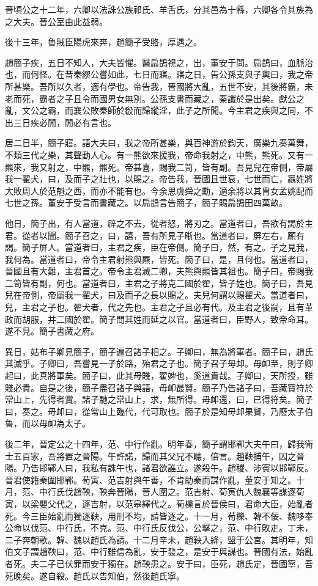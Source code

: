 晉頃公之十二年，六卿以法誅公族祁氏、羊舌氏，分其邑為十縣，六卿各令其族為之大夫。晉公室由此益弱。

後十三年，魯賊臣陽虎來奔，趙簡子受賂，厚遇之。

趙簡子疾，五日不知人，大夫皆懼。醫扁鵲視之，出，董安于問。扁鵲曰，血脈治也，而何怪。在昔秦繆公嘗如此，七日而寤。寤之日，告公孫支與子輿曰，我之帝所甚樂。吾所以久者，適有學也。帝告我，晉國將大亂，五世不安，其後將霸，未老而死，霸者之子且令而國男女無別。公孫支書而藏之，秦讖於是出矣。獻公之亂，文公之霸，而襄公敗秦師於殽而歸縱淫，此子之所聞。今主君之疾與之同，不出三日疾必閒，閒必有言也。

居二日半，簡子寤。語大夫曰，我之帝所甚樂，與百神游於鈞天，廣樂九奏萬舞，不類三代之樂，其聲動人心。有一熊欲來援我，帝命我射之，中熊，熊死。又有一羆來，我又射之，中羆，羆死。帝甚喜，賜我二笥，皆有副。吾見兒在帝側，帝屬我一翟犬，曰，及而子之壯也，以賜之。帝告我，晉國且世衰，七世而亡，嬴姓將大敗周人於范魁之西，而亦不能有也。今余思虞舜之勳，適余將以其胄女孟姚配而七世之孫。董安于受言而書藏之。以扁鵲言告簡子，簡子賜扁鵲田四萬畝。

他日，簡子出，有人當道，辟之不去，從者怒，將刃之。當道者曰，吾欲有謁於主君。從者以聞。簡子召之，曰，譆，吾有所見子晣也。當道者曰，屏左右，願有謁。簡子屏人。當道者曰，主君之疾，臣在帝側。簡子曰，然，有之。子之見我，我何為。當道者曰，帝令主君射熊與羆，皆死。簡子曰，是，且何也。當道者曰，晉國且有大難，主君首之。帝令主君滅二卿，夫熊與羆皆其祖也。簡子曰，帝賜我二笥皆有副，何也。當道者曰，主君之子將克二國於翟，皆子姓也。簡子曰，吾見兒在帝側，帝屬我一翟犬，曰及而子之長以賜之。夫兒何謂以賜翟犬。當道者曰，兒，主君之子也。翟犬者，代之先也。主君之子且必有代。及主君之後嗣，且有革政而胡服，并二國於翟。簡子問其姓而延之以官。當道者曰，臣野人，致帝命耳。遂不見。簡子書藏之府。

異日，姑布子卿見簡子，簡子遍召諸子相之。子卿曰，無為將軍者。簡子曰，趙氏其滅乎。子卿曰，吾嘗見一子於路，殆君之子也。簡子召子毋卹。毋卹至，則子卿起曰，此真將軍矣。簡子曰，此其母賤，翟婢也，奚道貴哉。子卿曰，天所授，雖賤必貴。自是之後，簡子盡召諸子與語，毋卹最賢。簡子乃告諸子曰，吾藏寶符於常山上，先得者賞。諸子馳之常山上，求，無所得。毋卹還，曰，已得符矣。簡子曰，奏之。毋卹曰，從常山上臨代，代可取也。簡子於是知毋卹果賢，乃廢太子伯魯，而以毋卹為太子。

後二年，晉定公之十四年，范、中行作亂。明年春，簡子謂邯鄲大夫午曰，歸我衛士五百家，吾將置之晉陽。午許諾，歸而其父兄不聽，倍言。趙鞅捕午，囚之晉陽。乃告邯鄲人曰，我私有誅午也，諸君欲誰立。遂殺午。趙稷、涉賓以邯鄲反。晉君使籍秦圍邯鄲。荀寅、范吉射與午善，不肯助秦而謀作亂，董安于知之。十月，范、中行氏伐趙鞅，鞅奔晉陽，晉人圍之。范吉射、荀寅仇人魏襄等謀逐荀寅，以梁嬰父代之，逐吉射，以范皋繹代之。荀櫟言於晉侯曰，君命大臣，始亂者死。今三臣始亂而獨逐鞅，用刑不均，請皆逐之。十一月，荀櫟、韓不佞、魏哆奉公命以伐范、中行氏，不克。范、中行氏反伐公，公擊之，范、中行敗走。丁未，二子奔朝歌。韓、魏以趙氏為請。十二月辛未，趙鞅入絳，盟于公宮。其明年，知伯文子謂趙鞅曰，范、中行雖信為亂，安于發之，是安于與謀也。晉國有法，始亂者死。夫二子已伏罪而安于獨在。趙鞅患之。安于曰，臣死，趙氏定，晉國寧，吾死晚矣。遂自殺。趙氏以告知伯，然後趙氏寧。

